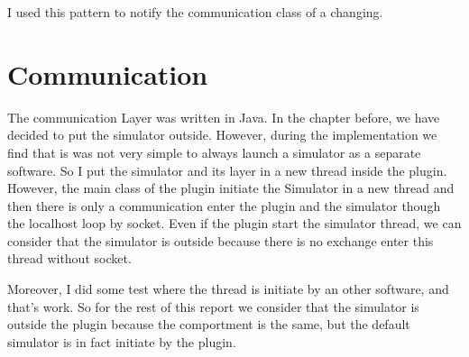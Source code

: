 I used this pattern to notify the communication class of a changing.

\section{Communication}



The communication Layer was written in Java. In the chapter before, we have decided to put the simulator outside. However, during the implementation we find that is was not very simple to always launch a simulator as a separate software. So I put the simulator and its layer in a new thread inside the plugin. However, the main class of the plugin initiate the Simulator in a new thread and then there is only a communication enter the plugin and the simulator though the localhost loop by socket. Even if the plugin start the simulator thread, we can consider that the simulator is outside because there is no exchange enter this thread without socket.

Moreover, I did some test where the thread is initiate by an other software, and that's work. So for the rest of this report we consider that the simulator is outside the plugin because the comportment is the same, but the default simulator is in fact initiate by the plugin.






